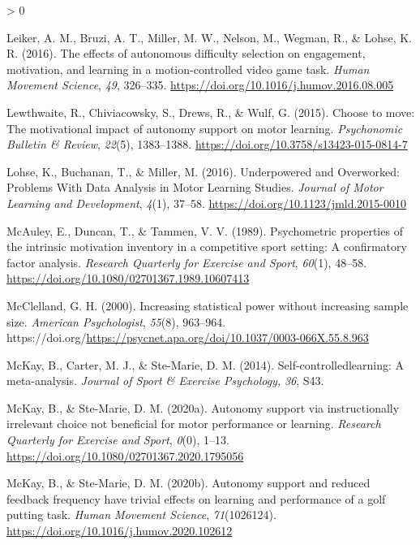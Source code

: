 \documentclass[
  english,
  man,floatsintext]{apa7}
\newlength{\cslhangindent}
\newenvironment{CSLReferences}[2] %
 {%
  \setlength{\parindent}{0pt}
  \ifodd #1 \everypar{\setlength{\hangindent}{\cslhangindent}}\ignorespaces\fi
  \ifnum #2 > 0
  \setlength{\parskip}{#2\baselineskip}
  \fi
 }%
 {}
\begin{document}
\begin{CSLReferences}{1}{0}
\leavevmode\hypertarget{ref-leiker2016}{}%
Leiker, A. M., Bruzi, A. T., Miller, M. W., Nelson, M., Wegman, R., \& Lohse, K. R. (2016). The effects of autonomous difficulty selection on engagement, motivation, and learning in a motion-controlled video game task. \emph{Human Movement Science}, \emph{49}, 326--335. \url{https://doi.org/10.1016/j.humov.2016.08.005}

\leavevmode\hypertarget{ref-lewthwaite2015}{}%
Lewthwaite, R., Chiviacowsky, S., Drews, R., \& Wulf, G. (2015). Choose to move: The motivational impact of autonomy support on motor learning. \emph{Psychonomic Bulletin \& Review}, \emph{22}(5), 1383--1388. \url{https://doi.org/10.3758/s13423-015-0814-7}

\leavevmode\hypertarget{ref-lohse2016}{}%
Lohse, K., Buchanan, T., \& Miller, M. (2016). Underpowered and Overworked: Problems With Data Analysis in Motor Learning Studies. \emph{Journal of Motor Learning and Development}, \emph{4}(1), 37--58. \url{https://doi.org/10.1123/jmld.2015-0010}

\leavevmode\hypertarget{ref-mcauley1989}{}%
McAuley, E., Duncan, T., \& Tammen, V. V. (1989). Psychometric properties of the intrinsic motivation inventory in a competitive sport setting: A confirmatory factor analysis. \emph{Research Quarterly for Exercise and Sport}, \emph{60}(1), 48--58. \url{https://doi.org/10.1080/02701367.1989.10607413}

\leavevmode\hypertarget{ref-mcclelland2000}{}%
McClelland, G. H. (2000). Increasing statistical power without increasing sample size. \emph{American Psychologist}, \emph{55}(8), 963--964. https://doi.org/\url{https://psycnet.apa.org/doi/10.1037/0003-066X.55.8.963}

\leavevmode\hypertarget{ref-mckay2014}{}%
McKay, B., Carter, M. J., \& Ste-Marie, D. M. (2014). Self-controlledlearning: A meta-analysis. \emph{Journal of Sport \& Exercise Psychology,} \emph{36}, S43.

\leavevmode\hypertarget{ref-mckay2020a}{}%
McKay, B., \& Ste-Marie, D. M. (2020a). Autonomy support via instructionally irrelevant choice not beneficial for motor performance or learning. \emph{Research Quarterly for Exercise and Sport}, \emph{0}(0), 1--13. \url{https://doi.org/10.1080/02701367.2020.1795056}

\leavevmode\hypertarget{ref-mckay2020b}{}%
McKay, B., \& Ste-Marie, D. M. (2020b). Autonomy support and reduced feedback frequency have trivial effects on learning and performance of a golf putting task. \emph{Human Movement Science}, \emph{71}(1026124). \url{https://doi.org/10.1016/j.humov.2020.102612}


\end{CSLReferences}
\end{document}
